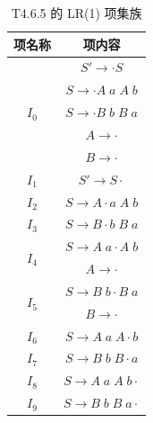 \documentclass[12pt]{ctexart}
\begin{document}
    \begin{table}[hp]
        \centering
        \caption{T4.6.5 的 LR(1) 项集族}
        \label{tab:t4-coll}
            \begin{tabular}{|c|c|}
                \hline
                项名称 & 项内容 \\ \hline
                \multirow{5}{*}{$I_0$} & $S' \to \cdot S$ \\
                 & $S \to \cdot A\;a\;A\;b$ \\
                 & $S \to \cdot B\;b\;B\;a$ \\
                 & $A \to \cdot$ \\
                 & $B \to \cdot$ \\ \hline
                \multirow{1}{*}{$I_1$} & $S' \to S \cdot$ \\ \hline
                \multirow{1}{*}{$I_2$} & $S \to A \cdot a\;A\;b$ \\ \hline
                \multirow{1}{*}{$I_3$} & $S \to B \cdot b\;B\;a$ \\ \hline
                \multirow{2}{*}{$I_4$} & $S \to A\;a \cdot A\;b$ \\
                 & $A \to \cdot$ \\ \hline
                \multirow{2}{*}{$I_5$} & $S \to B\;b \cdot B\;a$ \\
                 & $B \to \cdot$ \\ \hline
                \multirow{1}{*}{$I_6$} & $S \to A\;a\;A \cdot b$ \\ \hline
                \multirow{1}{*}{$I_7$} & $S \to B\;b\;B \cdot a$ \\ \hline
                \multirow{1}{*}{$I_8$} & $S \to A\;a\;A\;b \cdot $ \\ \hline
                \multirow{1}{*}{$I_9$} & $S \to B\;b\;B\;a \cdot $ \\ \hline
            \end{tabular}
    \end{table}
\end{document}
